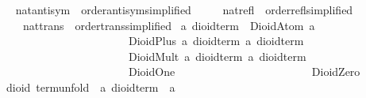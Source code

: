 \begin{isabellebody}
\endisatagproof
{\isafoldproof}%
%
\isadelimproof
\isanewline
%
\endisadelimproof
\isanewline
\ \ \isamarkupfalse%
\ nat{}antisym\ {}\ order{}antisym{}simplified{}\isanewline
\ \ \ \ \ nat{}refl\ {}\ order{}refl{}simplified{}\isanewline
\ \ \ \ \ nat{}trans\ {}\ order{}trans{}simplified{}\isanewline
\isanewline
{}\isamarkupfalse%
%
\isamarkuptrue%
\isamarkupfalse%
\ {}a\ dioid{}term\ {}\ DioidAtom\ {}a\isanewline
\ \ \ \ \ \ \ \ \ \ \ \ \ \ \ \ \ \ \ \ \ \ \ {}\ DioidPlus\ {}{}a\ dioid{}term{}\ {}{}a\ dioid{}term{}\isanewline
\ \ \ \ \ \ \ \ \ \ \ \ \ \ \ \ \ \ \ \ \ \ \ {}\ DioidMult\ {}{}a\ dioid{}term{}\ {}{}a\ dioid{}term{}\isanewline
\ \ \ \ \ \ \ \ \ \ \ \ \ \ \ \ \ \ \ \ \ \ \ {}\ DioidOne\isanewline
\ \ \ \ \ \ \ \ \ \ \ \ \ \ \ \ \ \ \ \ \ \ \ {}\ DioidZero\isanewline
\isanewline
{}\isamarkupfalse%
\ {}\ dioid{}\ term{}unfold\ {}{}\ {}{}a\ dioid{}term\ {}\ {}a{}\ \isanewline

\end{isabellebody}
